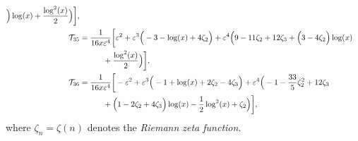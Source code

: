 \begin{align}
        \Big) \log (x)
        +\frac{\log ^2(x)}{2}
\Big)
% 
\bigg],
%
\nonumber\\
% 
\mi_{35} &=   \frac{1}{16 x \ep^4}  \bigg[
% 
\ep^2
+\ep^3 \Big(
        -3
        -\log (x)
        +4 \zeta_2
\Big)
+\ep^4 \Big(
        9
        -11 \zeta_2
        +12 \zeta_3
        +\Big(
                3
                -4 \zeta_2
        \Big) \log (x)
\nonumber\\& \qquad \quad        
        +\frac{\log ^2(x)}{2}
\Big)
% 
\bigg],
%
\nonumber\\
% 
\mi_{36} &=   \frac{1}{16 x \ep^4}  \bigg[
% 
-\ep^2
+\ep^3 \Big(
        -1
        +\log (x)
        +2 \zeta_2
        -4 \zeta_3
\Big)
+\ep^4 \Big(
        -1
        -\frac{33}{5} \zeta_2^2
        +12 \zeta_3
\nonumber\\& \qquad \quad        
        +\Big(
                1
                -2 \zeta_2
                +4 \zeta_3
        \Big) \log (x)
        -\frac{1}{2} \log ^2(x)
        +\zeta_2
\Big)
% 
\bigg]\nonumber,
\end{align}
\endgroup
where $\zeta_n=\zeta(n)$ denotes the \textit{Riemann zeta function}.